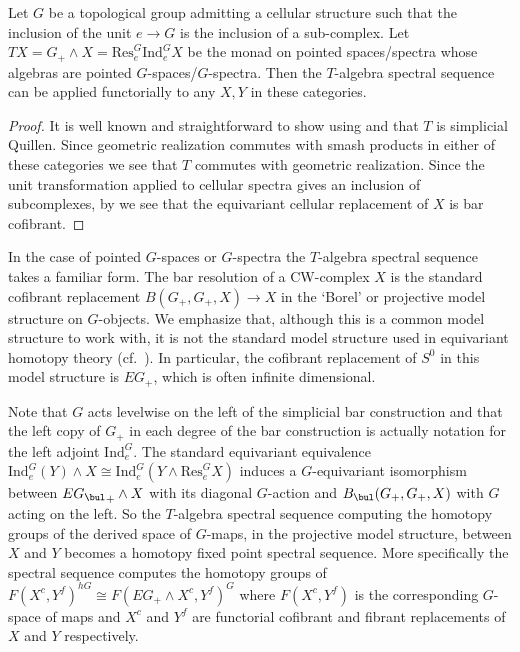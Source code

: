 \documentclass[leqno,oneside,english]{elsarticle}
\begin{document}
\begin{prop}
  Let $G$ be a topological group admitting a cellular structure such that the
  inclusion of the unit $e\rightarrow G$ is the inclusion of a sub-complex. Let $TX=G_+\wedge X={\mathrm{Res}}_e^G {\mathrm{Ind}}_e^G X$ be the
  monad on pointed spaces/spectra whose algebras are pointed $G$-spaces/$G$-spectra.
  Then the $T$-algebra spectral sequence can be applied functorially to any $X,Y$ in these categories.
\end{prop}
\begin{proof}
  It is well known and straightforward to show using
   and
   that $T$ is simplicial Quillen. Since
  geometric realization commutes with smash products in either of these
  categories we see that $T$ commutes with geometric realization. Since
  the unit transformation applied to cellular spectra gives an inclusion
  of subcomplexes, by  we see that the equivariant cellular replacement of $X$ is bar cofibrant.
\end{proof}

In the case of pointed $G$-spaces or $G$-spectra the $T$-algebra spectral sequence
takes a familiar form. The bar resolution of a CW-complex $X$ is
the standard cofibrant replacement $B(G_+, G_+, X)\rightarrow X$ in the
`Borel' or projective model structure on $G$-objects. We emphasize that, although this is a common model structure to work with, it is not the standard model structure used in equivariant homotopy theory (cf.~\cite{May96}). In particular, the cofibrant replacement of $S^0$ in this model structure is $EG_+$, which is often infinite dimensional. 

Note that $G$ acts levelwise on the left of the simplicial bar construction and that the left copy of $G_+$ in each degree of the bar construction is actually notation for the left adjoint ${\mathrm{Ind}}_e^G$. The standard equivariant equivalence ${\mathrm{Ind}}_e^G(Y)\wedge X\cong {\mathrm{Ind}}_e^G(Y\wedge {\mathrm{Res}}_e^G X)$ \cite[(I.1.6)]{May96} induces a $G$-equivariant isomorphism between ${EG_{\bul}}_+\wedge X$ with its diagonal $G$-action and $B_\bul(G_+,G_+, X)$ with $G$ acting on the left. So the $T$-algebra spectral sequence computing the homotopy groups of the derived space of $G$-maps, in the projective model structure, between $X$ and $Y$ becomes a homotopy fixed point spectral sequence. More specifically the spectral sequence computes the homotopy groups of $F(X^c,Y^{f})^{hG}\cong F(EG_+\wedge X^c,Y^{f})^G$ where $F(X^c,Y^{f})$ is the corresponding $G$-space of maps and $X^c$ and $Y^{f}$ are functorial cofibrant and fibrant replacements of $X$ and $Y$ respectively. 
\end{document}
